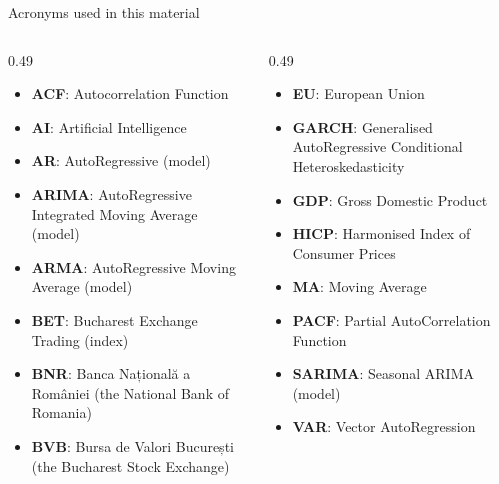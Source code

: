\begin{frame}{Acronyms used in this material}
\begin{columns}[T]
\begin{column}{0.49\textwidth}
\begin{itemize}\setlength{\itemsep}{0pt}
    \item \textbf{ACF}: Autocorrelation Function
    \item \textbf{AI}: Artificial Intelligence
    \item \textbf{AR}: AutoRegressive (model)
    \item \textbf{ARIMA}: AutoRegressive Integrated Moving Average (model)
    \item \textbf{ARMA}: AutoRegressive Moving Average (model)
    \item \textbf{BET}: Bucharest Exchange Trading (index)
    \item \textbf{BNR}: Banca Națională a României (the National Bank of Romania)
    \item \textbf{BVB}: Bursa de Valori București (the Bucharest Stock Exchange)
\end{itemize}
\end{column}
\begin{column}{0.49\textwidth}
\begin{itemize}\setlength{\itemsep}{0pt}
    \item \textbf{EU}: European Union
    \item \textbf{GARCH}: Generalised AutoRegressive Conditional Heteroskedasticity
    \item \textbf{GDP}: Gross Domestic Product
    \item \textbf{HICP}: Harmonised Index of Consumer Prices
    \item \textbf{MA}: Moving Average
    \item \textbf{PACF}: Partial AutoCorrelation Function
    \item \textbf{SARIMA}: Seasonal ARIMA (model)
    \item \textbf{VAR}: Vector AutoRegression
\end{itemize}
\end{column}
\end{columns}
\end{frame}

